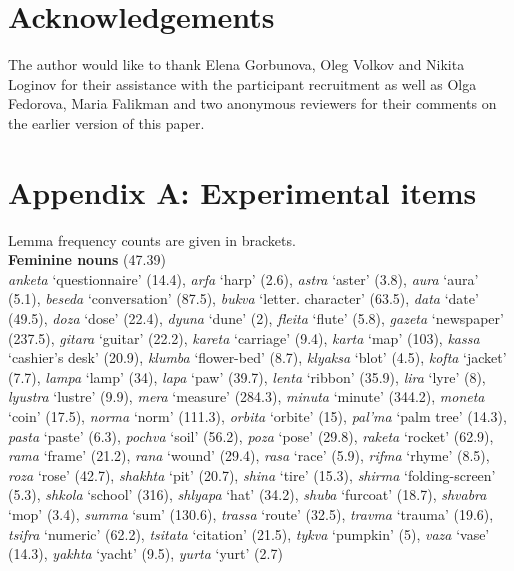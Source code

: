 \documentclass[output=paper, modfonts,newtxmath,hidelinks]{langscibook}
\begin{document}
\section*{Acknowledgements}

The author would like to thank Elena Gorbunova, Oleg Volkov and Nikita Loginov for their assistance with the participant recruitment as well as Olga Fedorova,  Maria Falikman and two anonymous reviewers for their comments on the earlier version of this paper.

\sloppy
\printbibliography[heading=subbibliography,notkeyword=this]

\appendix

\section*{Appendix A: Experimental items}

Lemma frequency counts are given in brackets.\\

\noindent \textbf{Feminine nouns} (47.39)\\

\noindent \textit{anketa} `questionnaire' (14.4),
\textit{arfa} `harp' (2.6),
\textit{astra} `aster' (3.8),
\textit{aura} `aura' (5.1),
\textit{beseda} `conversation' (87.5),
\textit{bukva} `letter. character' (63.5),
\textit{data} `date' (49.5),
\textit{doza} `dose' (22.4),
\textit{dyuna} `dune' (2),
\textit{fleita} `flute' (5.8),
\textit{gazeta} `newspaper' (237.5),
\textit{gitara} `guitar' (22.2),
\textit{kareta} `carriage' (9.4),
\textit{karta} `map' (103),
\textit{kassa} `cashier's desk' (20.9),
\textit{klumba} `flower-bed' (8.7),
\textit{klyaksa} `blot' (4.5),
\textit{kofta} `jacket' (7.7),
\textit{lampa} `lamp' (34),
\textit{lapa} `paw' (39.7),
\textit{lenta} `ribbon' (35.9),
\textit{lira} `lyre' (8),
\textit{lyustra} `lustre' (9.9),
\textit{mera} `measure' (284.3),
\textit{minuta} `minute' (344.2),
\textit{moneta} `coin' (17.5),
\textit{norma} `norm' (111.3),
\textit{orbita} `orbite' (15),
\textit{pal'ma} `palm tree' (14.3),
\textit{pasta} `paste' (6.3),
\textit{pochva} `soil' (56.2),
\textit{poza} `pose' (29.8),
\textit{raketa} `rocket' (62.9),
\textit{rama} `frame' (21.2),
\textit{rana} `wound' (29.4),
\textit{rasa} `race' (5.9),
\textit{rifma} `rhyme' (8.5),
\textit{roza} `rose' (42.7),
\textit{shakhta} `pit' (20.7),
\textit{shina} `tire' (15.3),
\textit{shirma} `folding-screen' (5.3),
\textit{shkola} `school' (316),
\textit{shlyapa} `hat' (34.2),
\textit{shuba} `furcoat' (18.7),
\textit{shvabra} `mop' (3.4),
\textit{summa} `sum' (130.6),
\textit{trassa} `route' (32.5),
\textit{travma} `trauma' (19.6),
\textit{tsifra} `numeric' (62.2),
\textit{tsitata} `citation' (21.5),
\textit{tykva} `pumpkin' (5),
\textit{vaza} `vase' (14.3),
\textit{yakhta} `yacht' (9.5),
\textit{yurta} `yurt' (2.7)\\
\end{document}
